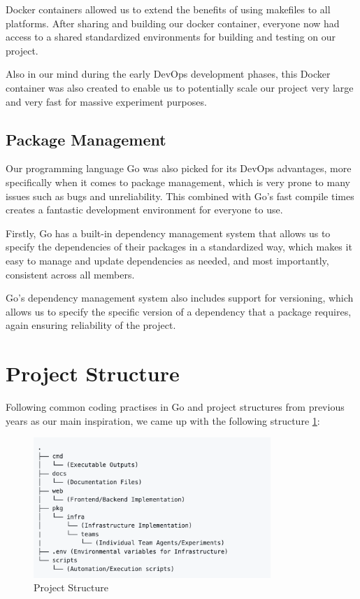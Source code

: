 Docker containers allowed us to extend the benefits of using makefiles to all platforms. After sharing and building our docker container, everyone now had access to a shared standardized environments for building and testing on our project. 

Also in our mind during the early DevOps development phases, this Docker container was also created to enable us to potentially scale our project very large and very fast for massive experiment purposes.


\subsection{Package Management}

Our  programming language Go was also picked for its DevOps advantages, more specifically when it comes to package management, which is very prone to many issues such as bugs and unreliability. This combined with Go's fast compile times creates a fantastic development environment for everyone to use. 

Firstly, Go has a built-in dependency management system that allows us to specify the dependencies of their packages in a standardized way, which makes it easy to manage and update dependencies as needed, and most importantly, consistent across all members. 

Go's dependency management system also includes support for versioning, which allows us to specify the specific version of a dependency that a package requires, again ensuring reliability of the project.

\newpage

\section{Project Structure}

Following common coding practises in Go and project structures from previous years as our main inspiration, we came up with the following structure \ref{fig:proj_struct}:

\begin{figure}[h]
    \centering
    \includegraphics[width=0.8\textwidth]{002_devops_project_management/figures/proj_struct.png}
    \caption{Project Structure}
    \label{fig:proj_struct}
\end{figure}